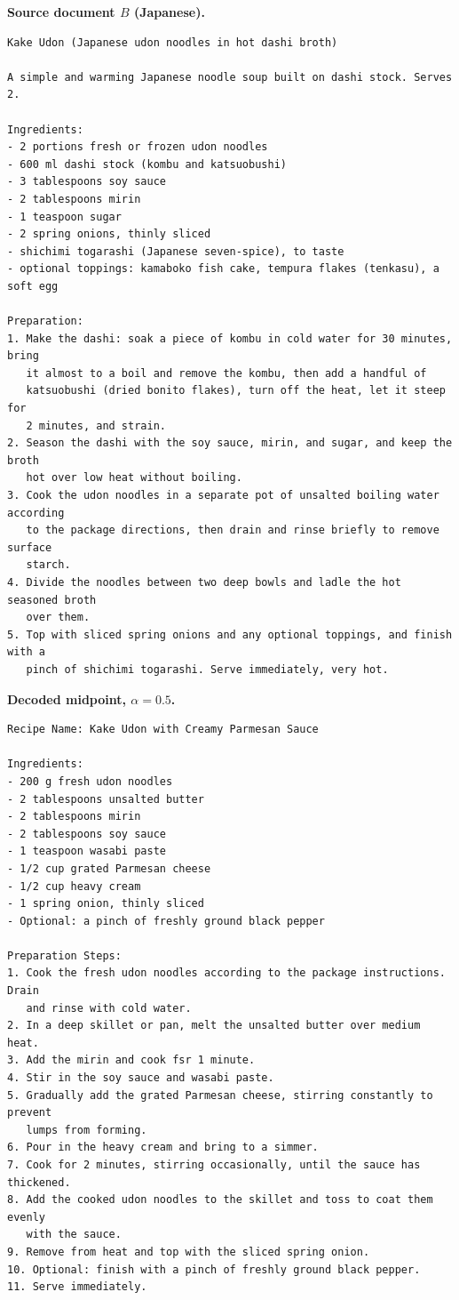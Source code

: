 \textbf{Source document $B$ (Japanese).}

\begin{snugshade}
\begin{Verbatim}[breaklines=true,breakanywhere=true,fontsize=\footnotesize]
Kake Udon (Japanese udon noodles in hot dashi broth)

A simple and warming Japanese noodle soup built on dashi stock. Serves 2.

Ingredients:
- 2 portions fresh or frozen udon noodles
- 600 ml dashi stock (kombu and katsuobushi)
- 3 tablespoons soy sauce
- 2 tablespoons mirin
- 1 teaspoon sugar
- 2 spring onions, thinly sliced
- shichimi togarashi (Japanese seven-spice), to taste
- optional toppings: kamaboko fish cake, tempura flakes (tenkasu), a soft egg

Preparation:
1. Make the dashi: soak a piece of kombu in cold water for 30 minutes, bring
   it almost to a boil and remove the kombu, then add a handful of
   katsuobushi (dried bonito flakes), turn off the heat, let it steep for
   2 minutes, and strain.
2. Season the dashi with the soy sauce, mirin, and sugar, and keep the broth
   hot over low heat without boiling.
3. Cook the udon noodles in a separate pot of unsalted boiling water according
   to the package directions, then drain and rinse briefly to remove surface
   starch.
4. Divide the noodles between two deep bowls and ladle the hot seasoned broth
   over them.
5. Top with sliced spring onions and any optional toppings, and finish with a
   pinch of shichimi togarashi. Serve immediately, very hot.
\end{Verbatim}
\end{snugshade}

\textbf{Decoded midpoint, $\alpha=0.5$.}

\begin{snugshade}
\begin{Verbatim}[breaklines=true,breakanywhere=true,fontsize=\footnotesize]
Recipe Name: Kake Udon with Creamy Parmesan Sauce

Ingredients:
- 200 g fresh udon noodles
- 2 tablespoons unsalted butter
- 2 tablespoons mirin
- 2 tablespoons soy sauce
- 1 teaspoon wasabi paste
- 1/2 cup grated Parmesan cheese
- 1/2 cup heavy cream
- 1 spring onion, thinly sliced
- Optional: a pinch of freshly ground black pepper

Preparation Steps:
1. Cook the fresh udon noodles according to the package instructions. Drain
   and rinse with cold water.
2. In a deep skillet or pan, melt the unsalted butter over medium heat.
3. Add the mirin and cook fsr 1 minute.
4. Stir in the soy sauce and wasabi paste.
5. Gradually add the grated Parmesan cheese, stirring constantly to prevent
   lumps from forming.
6. Pour in the heavy cream and bring to a simmer.
7. Cook for 2 minutes, stirring occasionally, until the sauce has thickened.
8. Add the cooked udon noodles to the skillet and toss to coat them evenly
   with the sauce.
9. Remove from heat and top with the sliced spring onion.
10. Optional: finish with a pinch of freshly ground black pepper.
11. Serve immediately.
\end{Verbatim}
\end{snugshade}

